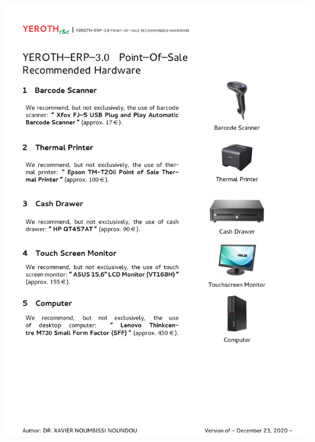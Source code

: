 \includegraphics[scale=0.93]{../yeroth-whitepapers/yeroth-erp-3-0-inventory-stock-recommended-hardware.pdf}


